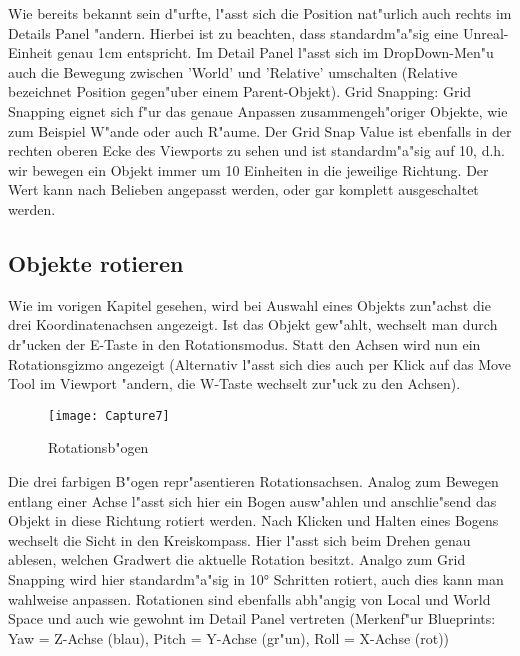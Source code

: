 \documentclass[11pt, titlepage]{article}
\begin{document}
\newline
\noindent Wie bereits bekannt sein d"urfte, l"asst sich die Position nat"urlich auch rechts im Details Panel "andern. Hierbei ist zu beachten, dass standardm"a"sig eine Unreal-Einheit genau 1cm entspricht. Im Detail Panel l"asst sich im DropDown-Men"u auch die Bewegung zwischen 'World' und 'Relative' umschalten (Relative bezeichnet Position gegen"uber einem Parent-Objekt). \newline
\newpage
\noindent Grid Snapping: \newline
\newline
\noindent Grid Snapping eignet sich f"ur das genaue Anpassen zusammengeh"origer Objekte, wie zum Beispiel W"ande oder auch R"aume. Der Grid Snap Value ist ebenfalls in der rechten oberen Ecke des Viewports zu sehen und ist standardm"a"sig auf 10, d.h. wir bewegen ein Objekt immer um 10 Einheiten in die jeweilige Richtung. Der Wert kann nach Belieben angepasst werden, oder gar komplett ausgeschaltet werden.

\subsection{Objekte rotieren}

\noindent Wie im vorigen Kapitel gesehen, wird bei Auswahl eines Objekts zun"achst die drei Koordinatenachsen angezeigt. Ist das Objekt gew"ahlt, wechselt man durch dr"ucken der E-Taste in den Rotationsmodus. Statt den Achsen wird nun ein Rotationsgizmo angezeigt (Alternativ l"asst sich dies auch per Klick auf das Move Tool im Viewport "andern, die W-Taste wechselt zur"uck zu den Achsen).

\begin{figure}[h]
\texttt{[image: Capture7]}
\caption{Rotationsb"ogen}
\end{figure}

\noindent Die drei farbigen B"ogen repr"asentieren Rotationsachsen. Analog zum Bewegen entlang einer Achse l"asst sich hier ein Bogen ausw"ahlen und anschlie"send das Objekt in diese Richtung rotiert werden. Nach Klicken und Halten eines Bogens wechselt die Sicht in den Kreiskompass. Hier l"asst sich beim Drehen genau ablesen, welchen Gradwert die aktuelle Rotation besitzt. Analgo zum Grid Snapping wird hier standardm"a"sig in 10° Schritten rotiert, auch dies kann man wahlweise anpassen. Rotationen sind ebenfalls abh"angig von Local und World Space und auch wie gewohnt im Detail Panel vertreten (Merkenf"ur Blueprints: Yaw = Z-Achse (blau), Pitch = Y-Achse (gr"un), Roll = X-Achse (rot)) 
\end{document}
